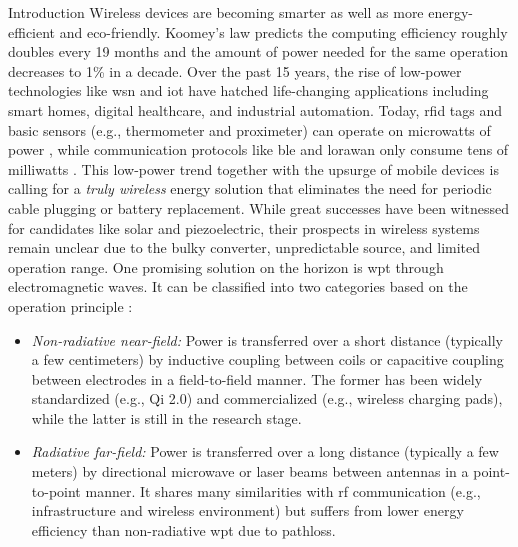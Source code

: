 \begin{section}{}
	\begin{subsection}{Introduction}
		Wireless devices are becoming smarter as well as more energy-efficient and eco-friendly.
		Koomey's law \citep{Koomey2011} predicts the computing efficiency roughly doubles every 19 months and the amount of power needed for the same operation decreases to 1\% in a decade.
		Over the past 15 years, the rise of low-power technologies like \gls{wsn} and \gls{iot} have hatched life-changing applications including smart homes, digital healthcare, and industrial automation.
		Today, \gls{rfid} tags and basic sensors (e.g., thermometer and proximeter) can operate on microwatts of power \cite{Huang2019,Hao2018}, while communication protocols like \gls{ble} and \gls{lorawan} only consume tens of milliwatts \cite{Correia2017b}.
		This low-power trend together with the upsurge of mobile devices is calling for a \emph{truly wireless} energy solution that eliminates the need for periodic cable plugging or battery replacement.
		While great successes have been witnessed for candidates like solar and piezoelectric, their prospects in wireless systems remain unclear due to the bulky converter, unpredictable source, and limited operation range.
		One promising solution on the horizon is \gls{wpt} through electromagnetic waves.
		It can be classified into two categories based on the operation principle \cite{Zhou2022}:
		\begin{itemize}
			\item \emph{Non-radiative near-field:} Power is transferred over a short distance (typically a few centimeters) by inductive coupling between coils or capacitive coupling between electrodes in a field-to-field manner. The former has been widely standardized (e.g., Qi 2.0) and commercialized (e.g., wireless charging pads), while the latter is still in the research stage.
			\item \emph{Radiative far-field:} Power is transferred over a long distance (typically a few meters) by directional microwave or laser beams between antennas in a point-to-point manner. It shares many similarities with \gls{rf} communication (e.g., infrastructure and wireless environment) but suffers from lower energy efficiency than non-radiative \gls{wpt} due to pathloss.
		\end{itemize}


\end{subsection}
\end{section}
